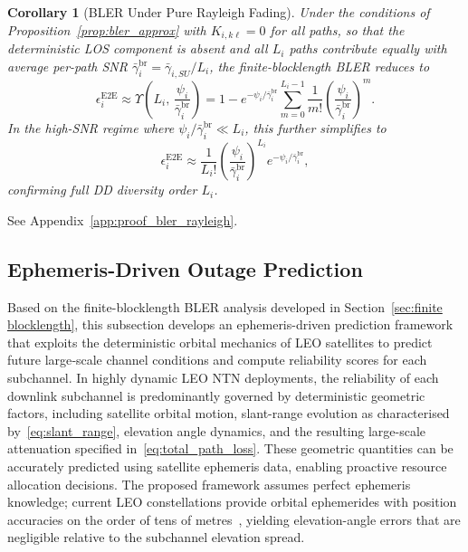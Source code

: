 \documentclass[lettersize,journal]{IEEEtran}
\newtheorem{corollary}{Corollary}
\begin{document}
\begin{corollary}[BLER Under Pure Rayleigh Fading]
\label{cor:bler_rayleigh}
Under the conditions of Proposition~\ref{prop:bler_approx} with 
$K_{i,k\ell} = 0$ for all paths, so that the deterministic LOS component 
is absent and all $L_i$ paths contribute equally with average per-path SNR 
$\bar{\gamma}_{i}^{\mathrm{br}} = \bar{\gamma}_{i,SU}/L_i$, the 
finite-blocklength BLER reduces to
\begin{equation}
\epsilon_i^{\mathrm{E2E}} \approx \Upsilon\!\left(L_i,\, 
\frac{\psi_i}{\bar{\gamma}_{i}^{\mathrm{br}}}\right) 
= 1 - e^{-\psi_i/\bar{\gamma}_{i}^{\mathrm{br}}} 
\sum_{m=0}^{L_i-1} \frac{1}{m!}
\left(\frac{\psi_i}{\bar{\gamma}_{i}^{\mathrm{br}}}\right)^{\!m}.
\label{eq:bler_rayleigh}
\end{equation}
In the high-SNR regime where 
$\psi_i/\bar{\gamma}_{i}^{\mathrm{br}} \ll L_i$, 
this further simplifies to
\begin{equation}
\epsilon_i^{\mathrm{E2E}} \approx \frac{1}{L_i!} 
\left(\frac{\psi_i}{\bar{\gamma}_{i}^{\mathrm{br}}}\right)^{\!L_i} 
e^{-\psi_i/\bar{\gamma}_{i}^{\mathrm{br}}},
\label{eq:bler_rayleigh_high_snr}
\end{equation}
confirming full DD diversity order $L_i$.
\end{corollary}

\begin{IEEEproof}
See Appendix~\ref{app:proof_bler_rayleigh}.
\end{IEEEproof}
\subsection{Ephemeris-Driven Outage Prediction}
\label{sec:ephemeris_prediction}

Based on the finite-blocklength BLER analysis developed in Section~\ref{sec:finite blocklength}, this subsection develops an ephemeris-driven prediction framework that exploits the deterministic orbital mechanics of LEO satellites to predict future large‑scale channel conditions and compute reliability scores for each subchannel. In highly dynamic LEO NTN deployments, the reliability of each downlink subchannel is predominantly governed by deterministic geometric factors, including satellite orbital motion, slant-range evolution as characterised by~\eqref{eq:slant_range}, elevation angle dynamics, and the resulting large-scale attenuation specified in~\eqref{eq:total_path_loss}. These geometric quantities can be accurately predicted using satellite ephemeris data, enabling proactive resource allocation decisions. The proposed framework assumes perfect ephemeris knowledge; current LEO constellations 
provide orbital ephemerides with position accuracies on the order of tens of metres~\cite{3GPP38821,3GPP_TR38811,10902219,montenbruck2008precision}, yielding elevation-angle errors that are negligible relative to the subchannel elevation spread.
\end{document}
